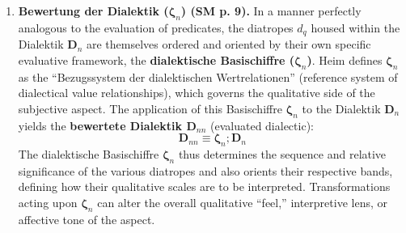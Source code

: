 \documentclass[12pt]{article}
\newcommand{\q}[1]{\enquote{#1}}
\begin{document}
\begin{enumerate}
    \item \textbf{Bewertung der Dialektik (\( \bm{\zeta}_n \)) (SM p. 9).}
    In a manner perfectly analogous to the evaluation of predicates, the diatropes \(d_q\) housed within the Dialektik \( \mathbf{D}_n \) are themselves ordered and oriented by their own specific evaluative framework, the \textbf{dialektische Basischiffre (\( \bm{\zeta}_n \))}. Heim defines \( \bm{\zeta}_n \) as the \q{Bezugssystem der dialektischen Wertrelationen} (reference system of dialectical value relationships), which governs the qualitative side of the subjective aspect. The application of this Basischiffre \( \bm{\zeta}_n \) to the Dialektik \( \mathbf{D}_n \) yields the \textbf{bewertete Dialektik \( \mathbf{D}_{nn} \)} (evaluated dialectic): 
    \begin{equation*}
    \mathbf{D}_{nn} \equiv \bm{\zeta}_n ; \mathbf{D}_n
    \end{equation*}
    The dialektische Basischiffre \( \bm{\zeta}_n \) thus determines the sequence and relative significance of the various diatropes and also orients their respective bands, defining how their qualitative scales are to be interpreted. Transformations acting upon \( \bm{\zeta}_n \) can alter the overall qualitative \q{feel,} interpretive lens, or affective tone of the aspect.


\end{enumerate}
\end{document}
